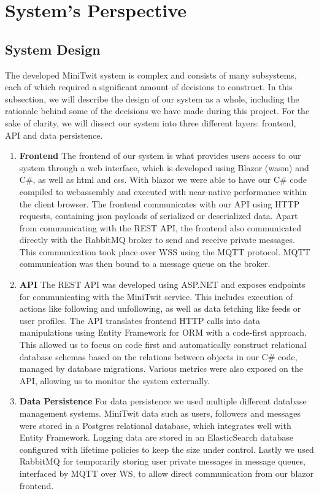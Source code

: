 \section{System's Perspective}
  \subsection{System Design}
  The developed MiniTwit system is complex and consists of many subsystems, each of which required a significant amount of decisions to construct.
  In this subsection, we will describe the design of our system as a whole, including the rationale behind some of the decisions we have made during this project.
  \newline
  For the sake of clarity, we will dissect our system into three different layers: frontend, API and data persistence.
  \begin{enumerate}
    \item \textbf{Frontend}\newline
    The frontend of our system is what provides users access to our system through a web interface, which is developed using Blazor (wasm) and C\#, as well as html and css.
    With blazor we were able to have our C\# code compiled to webassembly and executed with near-native performance within the client browser.
    The frontend communicates with our API using HTTP requests, containing json payloads of serialized or deserialized data.
    Apart from communicating with the REST API, the frontend also communicated directly with the RabbitMQ broker to send and receive private messages.
    This communication took place over WSS using the MQTT protocol. MQTT communication was then bound to a message queue on the broker. 
    
    \item \textbf{API}\newline
    The REST API was developed using ASP.NET and exposes endpoints for communicating with the MiniTwit service. 
    This includes execution of actions like following and unfollowing, as well as data fetching like feeds or user profiles.
    The API translates frontend HTTP calls into data manipulations using Entity Framework for ORM with a code-first approach.
    This allowed us to focus on code first and automatically construct relational database schemas based on the relations between objects in our C\# code, managed by database migrations.
    Various metrics were also exposed on the API, allowing us to monitor the system externally.
    
    \item \textbf{Data Persistence}\newline
    For data persistence we used multiple different database management systems. 
    MiniTwit data such as users, followers and messages were stored in a Postgres relational database, which integrates well with Entity Framework.
    Logging data are stored in an ElasticSearch database configured with lifetime policies to keep the size under control.
    Lastly we used RabbitMQ for temporarily storing user private messages in message queues, interfaced by MQTT over WS, to allow direct communication from our blazor frontend.
  \end{enumerate}


